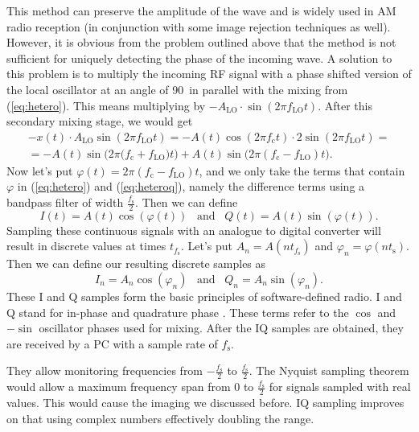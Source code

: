 \documentclass[a4paper,12pt,twoside,openright]{report}
\begin{document}
This method can preserve the amplitude of the wave and is widely used in AM radio reception (in conjunction with some image rejection techniques as well). However, it is obvious from the problem outlined above that the method is not sufficient for uniquely detecting the phase of the incoming wave. A solution to this problem is to multiply the incoming RF signal with a phase shifted version of the local oscillator at an angle of 90\degree\ in parallel with the mixing from (\ref{eq:hetero}). This means multiplying by $-A_\text{LO} \cdot \sin(2 \pi f_\text{LO} t)$. After this secondary mixing stage, we would get
\begin{multline}
\label{eq:heteroq}
- x(t) \cdot A_\text{LO} \sin(2 \pi f_\text{LO} t) =  -A(t) \cos(2 \pi f_\text{c} t) \cdot 2 \sin(2 \pi f_\text{LO} t) = \\
=  - A(t) \sin\big( 2 \pi  (f_\text{c} + f_\text{LO} \big) t\big) + A(t) \sin\big( 2 \pi (f_\text{c} - f_\text{LO}) t \big) .
\end{multline}
Now let's put $\varphi(t) = 2 \pi (f_\text{c}-f_\text{LO}) t$, and we only take the terms that contain $\varphi$ in (\ref{eq:hetero}) and (\ref{eq:heteroq}), namely the difference terms using a bandpass filter of width $\frac{f_\text{s}}{2}$. Then we can define
\begin{equation}
I(t) = A(t) \cos( \varphi (t)) \,\,\,\,\, \text{and} \,\,\,\,\, Q(t) = A(t) \sin( \varphi (t)) .
\end{equation}
Sampling these continuous signals with an analogue to digital converter will result in discrete values at times $t_{f_\text{s}}$. Let's put $A_{n} = A(n t_{f_\text{s}})$ and $\varphi_{n} = \varphi(n t_\text{s})$. Then we can define our resulting discrete samples as
\begin{equation}
I_{n} = A_{n} \cos( \varphi_{n} ) \,\,\,\,\, \text{and} \,\,\,\,\, Q_{n} = A_{n} \sin( \varphi _{n}) .
\end{equation}
These I and Q samples form the basic principles of software-defined radio. I and Q stand for in-phase and quadrature phase \cite{kirkhorn1999introduction}. These terms refer to the $\cos$ and $-\sin$ oscillator phases used for mixing. After the IQ samples are obtained, they are received by a PC with a sample rate of $f_\text{s}$.

They allow monitoring frequencies from $-\frac{f_\text{s}}{2}$ to $\frac{f_\text{s}}{2}$. The Nyquist sampling theorem would allow a maximum frequency span from $0$ to $\frac{f_\text{s}}{2}$ for signals sampled with real values. This would cause the imaging we discussed before. IQ sampling improves on that using complex numbers effectively doubling the range.
\end{document}
